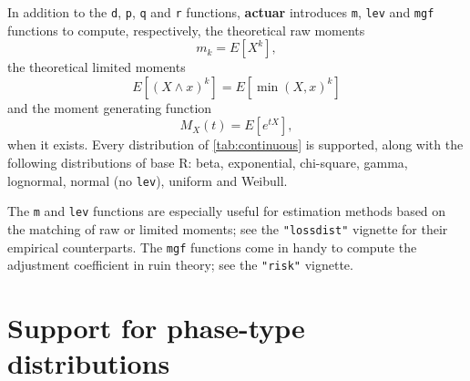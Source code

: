 \documentclass[x11names]{article}
\newcommand{\E}[1]{E[ #1 ]}
\newcommand{\proglang}[1]{\textsf{#1}}
\newcommand{\pkg}[1]{\textbf{#1}}
\newcommand{\code}[1]{\texttt{#1}}
\begin{document}
In addition to the \code{d}, \code{p}, \code{q} and \code{r}
functions, \pkg{actuar} introduces \code{m}, \code{lev} and \code{mgf}
functions to compute, respectively, the theoretical raw moments
\begin{equation*}
  m_k = \E{X^k},
\end{equation*}
the theoretical limited moments
\begin{equation*}
  \E{(X \wedge x)^k} = \E{\min(X, x)^k}
\end{equation*}
and the moment generating function
\begin{equation*}
  M_X(t) = \E{e^{tX}},
\end{equation*}
when it exists. Every distribution of \autoref{tab:continuous} is
supported, along with the following distributions of base
\proglang{R}: beta, exponential, chi-square, gamma, lognormal, normal
(no \code{lev}), uniform and Weibull.

The \code{m} and \code{lev} functions are especially useful for
estimation methods based on the matching of raw or limited moments;
see the \code{"lossdist"} vignette for their empirical counterparts.
The \code{mgf} functions come in handy to compute the adjustment
coefficient in ruin theory; see the \code{"risk"} vignette.




\section{Support for phase-type distributions}
\label{sec:phase-type}
\end{document}
